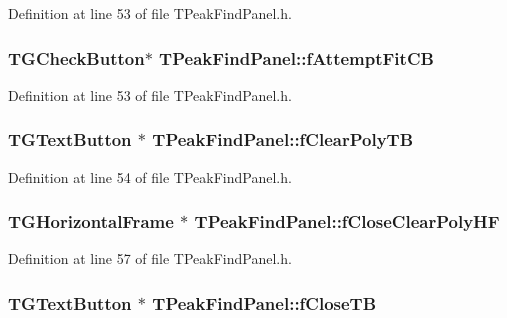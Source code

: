 Definition at line 53 of file TPeakFindPanel.h.

\subsubsection[{fAttemptFitCB}]{\setlength{\rightskip}{0pt plus 5cm}TGCheckButton$\ast$ {\bf TPeakFindPanel::fAttemptFitCB}\hspace{0.3cm}{\ttfamily  [private]}}\label{classTPeakFindPanel_a3c863a7594284859aefa215d968d3ac1}


Definition at line 53 of file TPeakFindPanel.h.

\subsubsection[{fClearPolyTB}]{\setlength{\rightskip}{0pt plus 5cm}TGTextButton $\ast$ {\bf TPeakFindPanel::fClearPolyTB}\hspace{0.3cm}{\ttfamily  [private]}}\label{classTPeakFindPanel_a59d69b23e15ca787e68757914d33c6b0}


Definition at line 54 of file TPeakFindPanel.h.

\subsubsection[{fCloseClearPolyHF}]{\setlength{\rightskip}{0pt plus 5cm}TGHorizontalFrame $\ast$ {\bf TPeakFindPanel::fCloseClearPolyHF}\hspace{0.3cm}{\ttfamily  [private]}}\label{classTPeakFindPanel_a22bfd871341ca3b3ece3e4682531414f}


Definition at line 57 of file TPeakFindPanel.h.

\subsubsection[{fCloseTB}]{\setlength{\rightskip}{0pt plus 5cm}TGTextButton $\ast$ {\bf TPeakFindPanel::fCloseTB}\hspace{0.3cm}{\ttfamily  [private]}}\label{classTPeakFindPanel_a3e84f92a878fc6810a25ea4f116e8a1c}


